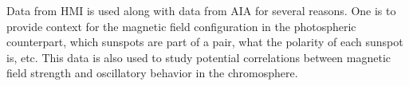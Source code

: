 Data from HMI is
used along with data from AIA for several reasons.
One is to provide context for the magnetic field configuration in the
photospheric counterpart, which sunspots are part of a pair, what
the polarity of each sunspot is, etc.
This data is also
used to study potential
correlations between magnetic field strength and oscillatory
behavior in the chromosphere.
